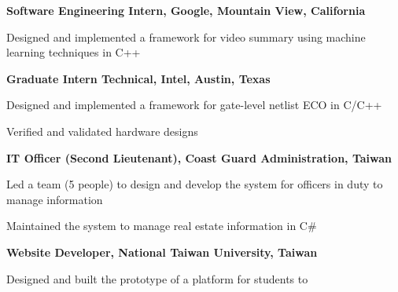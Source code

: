 

\begin{myexp}
\item \textbf{Software Engineering Intern, Google, Mountain View, California}
    \begin{mybullet}
        \item Designed and implemented a framework for video summary using
            machine learning techniques in C++
    \end{mybullet}
\item \textbf{Graduate Intern Technical, Intel, Austin, Texas}   
    \begin{mybullet}
        \item Designed and implemented a framework for gate-level netlist ECO
            in C/C++
        \item Verified and validated hardware designs
    \end{mybullet}
\item \textbf{IT Officer (Second Lieutenant), Coast Guard Administration, 
    Taiwan }   
    \begin{mybullet}
        \item Led a team (5 people) to design and develop the system for 
            officers in duty to manage information
        \item Maintained the system to manage real estate information in C\#
    \end{mybullet}
\item \textbf{Website Developer, National Taiwan University, Taiwan} 
    \begin{mybullet}
        \item Designed and built the prototype of a platform for students to 

\end{mybullet}
\end{myexp}
